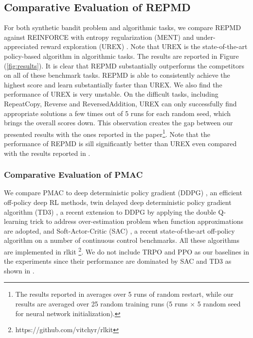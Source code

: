 \subsection{Comparative Evaluation of REPMD}

For both synthetic bandit problem and algorithmic tasks, we compare REPMD against REINFORCE with entropy regularization (MENT) \citep{williams1992simple} and under-appreciated reward exploration (UREX) \citep{nachum2017improving}. Note that UREX is the state-of-the-art policy-based algorithm in algorithmic tasks. The results are reported in Figure (\ref{fig:results}). It is clear that REPMD substantially outperforms the competitors on all of these benchmark tasks. REPMD is able to consistently achieve the highest score and learn substantially faster than UREX. We also find the performance of UREX is very unstable. On the difficult tasks, including RepeatCopy, Reverse and ReversedAddition, UREX can only successfully find appropriate solutions a few times out of 5 runs for each random seed, which brings the overall scores down. This observation creates the gap between our presented results with the ones reported in the paper\footnote{The results reported in \citet{nachum2017improving} averages over 5 runs of random restart, while our results are averaged over 25 random training runs (5 runs $\times$ 5 random seed for neural network initialization). }. Note that the performance of REPMD is sill significantly better than UREX even compared with the results reported in \citet{nachum2017improving}. 

\subsubsection{Comparative Evaluation of PMAC}

We compare PMAC to deep deterministic policy gradient (DDPG) \citep{lillicrap2015continuous}, an efficient off-policy deep
RL methods, twin delayed deep deterministic policy gradient algorithm (TD3) \citep{fujimoto2018addressing}, a recent extension to DDPG by applying the double Q-learning trick to address over-estimation problem when function approximations are adopted, and Soft-Actor-Critic (SAC) \citep{haarnoja2018soft}, a recent state-of-the-art off-policy algorithm on a number of continuous control benchmarks. All these algorithms are implemented in rlkit \footnote{https://github.com/vitchyr/rlkit}. We do not include TRPO and PPO as our baselines in the experiments since their performance are dominated by SAC and TD3 as shown in \citep{haarnoja2018soft,fujimoto2018addressing}. 

